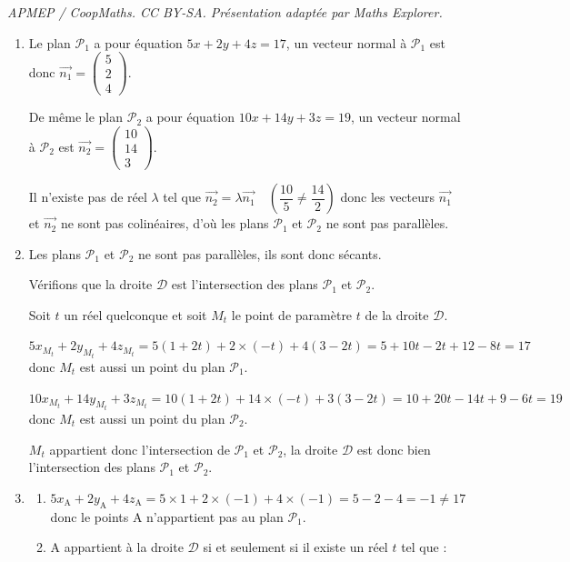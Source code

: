 \documentclass[10pt]{article}
\providecommand{\vect}[1]{\overrightarrow{#1}}
\begin{document}
\noindent\textit{APMEP / CoopMaths. CC BY-SA. Présentation adaptée par Maths Explorer.}\par\medskip
\bigskip

\begin{enumerate}
\item  Le plan $\mathcal{P}_1$ a pour équation $5x+2y+4z=17$,  un vecteur normal à $\mathcal{P}_1$ est donc $\vect{n_1}=\begin{pmatrix} 5\\2\\4 \end{pmatrix}$. 

De même le plan $\mathcal{P}_2$ a pour équation $10x+14y+3z=19$,  un vecteur normal à $\mathcal{P}_2$ est  $\vect{n_2}=\begin{pmatrix} 10\\14\\3 \end{pmatrix}$. 

Il n'existe pas de réel $\lambda$ tel que $\vect{n_2}=\lambda \vect{n_1} \quad \left(\dfrac{10}{5}\neq\dfrac{14}{2}\right)$  donc les vecteurs $\vect{n_1}$ et $\vect{n_2}$ ne sont pas colinéaires, d'où les plans $\mathcal{P}_1$ et $\mathcal{P}_2$ ne sont pas parallèles.

\item Les plans $\mathcal{P}_1$ et $\mathcal{P}_2$ ne sont pas parallèles,  ils sont donc sécants.

Vérifions que la droite $\mathcal{D}$ est l'intersection des plans  $\mathcal{P}_1$ et $\mathcal{P}_2$.

Soit $t$ un réel quelconque et soit $M_t$ le point de paramètre $t$ de la droite $\mathcal{D}$.

$5x_{M_t}+2y_{M_t}+4z_{M_t}=5 (1+2t)+2\times (-t) +4 (3 - 2t)= 5+10t-2t+12-8t=17$ donc $M_t$ est aussi un point du plan $\mathcal{P}_1$.

$10x_{M_t}+ 14y_{M_t}+ 3z_{M_t}=10 (1 + 2t)+14\times (- t) +3 (3 - 2t)= 10+20t-14t+9-6t=19$ donc $M_t$ est aussi un point du plan $\mathcal{P}_2$.

$M_t$ appartient donc l'intersection de $\mathcal{P}_1$ et $\mathcal{P}_2$,  la droite $\mathcal{D}$ est donc bien  l'intersection des plans  $\mathcal{P}_1$ et $\mathcal{P}_2$.

\item
\begin{enumerate}
\item   $5x_{\mathrm{A}}+2y_{\mathrm{A}}+4z_{\mathrm{A}}=5 \times 1 +2\times (-1) +4 \times (-1)= 5-2-4=-1 \neq 17$ donc le points A n'appartient pas au plan $\mathcal{P}_1$.
	\item  A appartient à la droite $\mathcal{D}$ si et seulement si il existe un réel $t$ tel que : 
	

\end{enumerate}
\end{enumerate}
\end{document}
